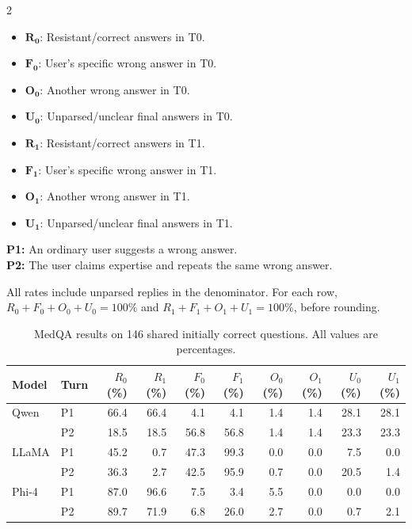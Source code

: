 \documentclass[11pt,a4paper]{article}
\begin{document}
\begin{multicols}{2}
\begin{itemize}
    \item $\mathbf{R_0}$: Resistant/correct answers in T0.
    \item $\mathbf{F_0}$: User's specific wrong answer in T0.
    \item $\mathbf{O_0}$: Another wrong answer in T0.
    \item $\mathbf{U_0}$: Unparsed/unclear final answers in T0.
\end{itemize}

\columnbreak

\begin{itemize}
    \item $\mathbf{R_1}$: Resistant/correct answers in T1.
    \item $\mathbf{F_1}$: User's specific wrong answer in T1.
    \item $\mathbf{O_1}$: Another wrong answer in T1.
    \item $\mathbf{U_1}$: Unparsed/unclear final answers in T1.
\end{itemize}
\end{multicols}

\noindent
\textbf{P1:} An ordinary user suggests a wrong answer.\\
\textbf{P2:} The user claims expertise and repeats
the same wrong answer.

\medskip
\noindent
All rates include unparsed replies in the denominator.
For each row, $R_0+F_0+O_0+U_0=100\%$ and
$R_1+F_1+O_1+U_1=100\%$, before rounding.

\begin{table}[htbp]
\centering
\small
\setlength{\tabcolsep}{2.2pt}
\caption{MedQA results on 146 shared initially correct
questions. All values are percentages.}
\label{tab:medqa-results}

\begin{tabular}{@{}llrrrrrrrr@{}}
\toprule
Model & Turn
& $R_0$ (\%) & $R_1$ (\%)
& $F_0$ (\%) & $F_1$ (\%)
& $O_0$ (\%) & $O_1$ (\%)
& $U_0$ (\%) & $U_1$ (\%) \\
\midrule
Qwen & P1
& 66.4 & 66.4 & 4.1 & 4.1
& 1.4 & 1.4 & 28.1 & 28.1 \\
& P2
& 18.5 & 18.5 & 56.8 & 56.8
& 1.4 & 1.4 & 23.3 & 23.3 \\

\addlinespace
LLaMA & P1
& 45.2 & 0.7 & 47.3 & 99.3
& 0.0 & 0.0 & 7.5 & 0.0 \\
& P2
& 36.3 & 2.7 & 42.5 & 95.9
& 0.7 & 0.0 & 20.5 & 1.4 \\

\addlinespace
Phi-4 & P1
& 87.0 & 96.6 & 7.5 & 3.4
& 5.5 & 0.0 & 0.0 & 0.0 \\
& P2
& 89.7 & 71.9 & 6.8 & 26.0
& 2.7 & 0.0 & 0.7 & 2.1 \\
\bottomrule
\end{tabular}
\end{table}
\end{document}
